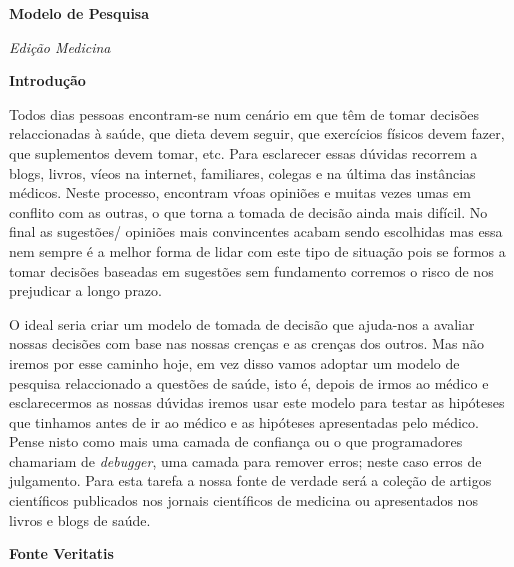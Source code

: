 \documentclass[12pt]{article}
\begin{document}
 

\begin{titlepage}
    \begin{center}
        \Huge\textbf{Modelo de Pesquisa}
         
        \Large\textit{Edi\c c\~ao Medicina}
         
        \vspace{10cm}
    \end{center}
\end{titlepage}

\begin{center}
    \Huge\textbf{Introdu\c c\~ao}
\end{center}

Todos dias pessoas encontram-se num cen\'ario em que t\^em de tomar decis\~oes
relaccionadas \`a sa\'ude, que dieta devem seguir, que exerc\'icios f\'isicos
devem fazer, que suplementos devem tomar, etc. Para esclarecer essas d\'uvidas
recorrem a blogs, livros, v\'ieos na internet, familiares, colegas e na
\'ultima das inst\^ancias m\'edicos. Neste processo, encontram v\'roas
opini\~oes e muitas vezes umas em conflito com as outras, o que torna a tomada
de decis\~ao ainda mais dif\'icil.
No final as sugest\~oes/ opini\~oes mais convincentes acabam sendo escolhidas
mas essa nem sempre \'e a melhor forma de lidar com este tipo de situa\c c\~ao
pois se formos a tomar decis\~oes baseadas em sugest\~oes sem fundamento
corremos o risco de nos prejudicar a longo prazo.  

O ideal seria criar um modelo de tomada de decis\~ao que ajuda-nos a avaliar
nossas decis\~oes com base nas nossas cren\c cas e as cren\c cas dos outros. 
Mas n\~ao iremos por esse caminho hoje, em vez disso vamos adoptar um modelo de
pesquisa relaccionado a quest\~oes de sa\'ude, isto \'e, depois de irmos ao
m\'edico e esclarecermos as nossas d\'uvidas iremos usar este modelo para
testar as hip\'oteses que tinhamos antes de ir ao m\'edico e as hip\'oteses
apresentadas pelo m\'edico.  
Pense nisto como mais uma camada de confian\c ca ou
o que programadores chamariam de \textit{debugger}, uma camada para remover
erros; neste caso erros de julgamento.  Para esta tarefa a nossa fonte de verdade ser\'a a cole\c c\~ao de artigos
cient\'ificos publicados nos jornais cient\'ificos de medicina ou apresentados
nos livros e blogs de sa\'ude.  
\pagebreak


\begin{center}
    \Huge\textbf{Fonte Veritatis}
\end{center}
\end{document}
